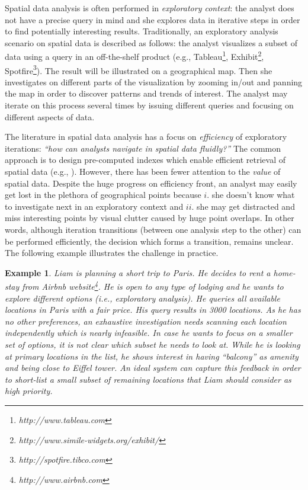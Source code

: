 \documentclass[conference,compsoc]{IEEEtran}
\newtheorem{example}{Example}
\begin{document}
Spatial data analysis is often performed in {\em exploratory context}: the analyst does not have a precise query in mind and she explores data in iterative steps in order to find potentially interesting results. Traditionally, an exploratory analysis scenario on spatial data is described as follows: the analyst visualizes a subset of data using a query in an off-the-shelf product (e.g., Tableau\footnote{\it http://www.tableau.com},
 Exhibit\footnote{\it http://www.simile-widgets.org/exhibit/},
Spotfire\footnote{\it http://spotfire.tibco.com}). The result will be illustrated on a geographical map. Then she investigates on different parts of the visualization by zooming in/out and panning the map in order to discover patterns and trends of interest. The analyst may iterate on this process several times by issuing different queries and focusing on different aspects of data.

The literature in spatial data analysis has a focus on {\em efficiency} of exploratory iterations: {\em ``how can analysts navigate in spatial data fluidly?''} The common approach is to design pre-computed indexes which enable efficient retrieval of spatial data (e.g., \cite{lins2013nanocubes}). However, there has been fewer attention to the {\em value} of spatial data. Despite the huge progress on efficiency front, an analyst may easily get lost in the plethora of geographical points because $i.$ she doesn't know what to investigate next in an exploratory context and $ii.$ she may get distracted and miss interesting points by visual clutter caused by huge point overlaps. In other words, although iteration transitions (between one analysis step to the other) can be performed efficiently, the decision which forms a transition, remains unclear. The following example illustrates the challenge in practice.

\vspace{5pt}
\begin{example}
\label{ex:airbnb}
Liam is planning a short trip to Paris. He decides to rent a home-stay from Airbnb website\footnote{\it http://www.airbnb.com}. He is open to any type of lodging and he wants to explore different options (i.e., exploratory analysis). He queries all available locations in Paris with a fair price. His query results in 3000 locations. As he has no other preferences, an exhaustive investigation needs scanning each location independently which is nearly infeasible. In case he wants to focus on a smaller set of options, it is not clear which subset he needs to look at. While he is looking at primary locations in the list, he shows interest in having ``balcony'' as amenity and being close to Eiffel tower. An ideal system can capture this feedback in order to short-list a small subset of remaining locations that Liam should consider as high priority.
\end{example}
\end{document}
